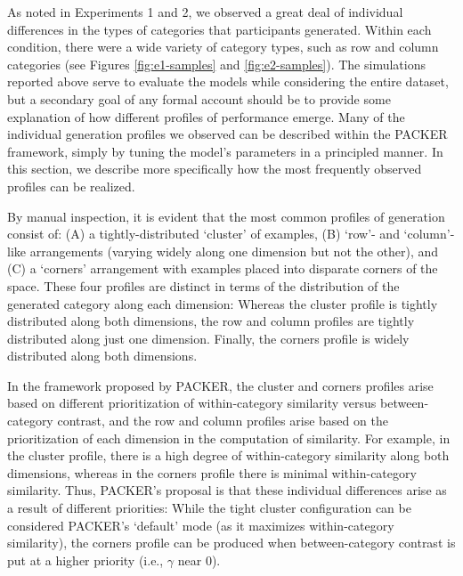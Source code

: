 \documentclass[12pt]{article}
\begin{document}
\begin{flushleft}
As noted in Experiments 1 and 2, we observed a great deal of individual differences in the types of categories that participants generated. Within each condition, there were a wide variety of category types, such as row and column categories (see Figures \ref{fig:e1-samples} and \ref{fig:e2-samples}). The simulations reported above serve to evaluate the models while considering the entire dataset, but a secondary goal of any formal account should be to provide some explanation of how different profiles of performance emerge. Many of the individual generation profiles we observed can be described within the PACKER framework, simply by tuning the model's parameters in a principled manner. In this section, we describe more specifically how the most frequently observed profiles can be realized.

By manual inspection, it is evident that the most common profiles of generation consist of: (A) a tightly-distributed `cluster' of examples, (B) `row'- and `column'-like arrangements (varying widely along one dimension but not the other), and (C) a `corners' arrangement with examples placed into disparate corners of the space. These four profiles are distinct in terms of the distribution of the generated category along each dimension: Whereas the cluster profile is tightly distributed along both dimensions, the row and column profiles are tightly distributed along just one dimension. Finally, the corners profile is widely distributed along both dimensions.

In the framework proposed by PACKER, the cluster and corners profiles arise based on different prioritization of within-category similarity versus between-category contrast, and the row and column profiles arise based on the prioritization of each dimension in the computation of similarity. For example, in the cluster profile, there is a high degree of within-category similarity along both dimensions, whereas in the corners profile there is minimal within-category similarity. Thus, PACKER's proposal is that these individual differences arise as a result of different priorities: While the tight cluster configuration can be considered PACKER's `default' mode (as it maximizes within-category similarity), the corners profile can be produced when between-category contrast is put at a higher priority (i.e., $\gamma$ near $0$).


\end{flushleft}
\end{document}
